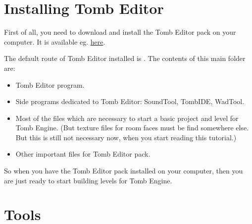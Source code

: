 \chapter{Installing Tomb Editor}
First of all, you need to download and install the Tomb Editor pack on your computer. It is available eg. \href{https://tombengine.com/}{here}.
\par The default route of Tomb Editor installed is . The contents of this main folder are:
\begin{itemize}
    \item Tomb Editor program.
    \item Side programs dedicated to Tomb Editor: SoundTool, TombIDE, WadTool.
    \item Most of the files which are necessary to start a basic project and level for Tomb Engine. (But texture files for room faces must be find somewhere else. But this is still not necessary now, when you start reading this tutorial.)
    \item Other important files for Tomb Editor pack.
\end{itemize}
So when you have the Tomb Editor pack installed on your computer, then you are just ready to start building levels for Tomb Engine. \cite{akyv_tutorial}

\chapter{Tools}
